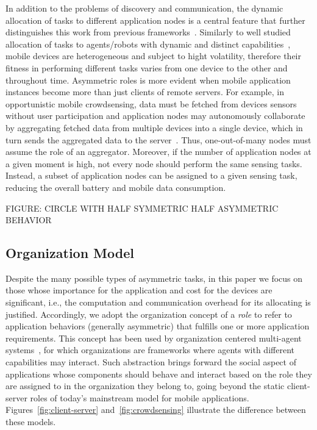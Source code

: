 In addition to the problems of discovery and communication, the dynamic allocation of tasks to different application nodes is a central feature that further distinguishes this work from previous frameworks~\cite{}. Similarly to well studied allocation of tasks to agents/robots with dynamic and distinct capabilities~\cite{}, mobile devices are heterogeneous and subject to hight volatility, therefore their fitness in performing different tasks varies from one device to the other and throughout time. Asymmetric roles is more evident when mobile application instances become more than just clients of remote servers. For example, in opportunistic mobile crowdsensing, data must be fetched from devices sensors without user participation and application nodes may autonomously collaborate by aggregating fetched data from multiple devices into a single device, which in turn sends the aggregated data to the server~\cite{}. Thus, one-out-of-many nodes must assume the role of an aggregator. Moreover, if the number of application nodes at a given moment is high, not every node should perform the same sensing tasks. Instead, a subset of application nodes can be assigned to a given sensing task, reducing the overall battery and mobile data consumption. 

FIGURE: CIRCLE WITH HALF SYMMETRIC HALF ASYMMETRIC BEHAVIOR

\subsection{Organization Model}

Despite the many possible types of asymmetric tasks, in this paper we focus on those whose importance for the application and cost for the devices are significant, i.e., the computation and communication overhead for its allocating is justified. Accordingly, we adopt the organization concept of a \textit{role} to refer to application behaviors (generally asymmetric) that fulfills one or more application requirements. This concept has been used by organization centered multi-agent systems~\cite{}, for which organizations are frameworks where agents with different capabilities may interact. Such abstraction brings forward the social aspect of applications whose components should behave and interact based on the role they are assigned to in the organization they belong to, going beyond the static client-server roles of today's mainstream model for mobile applications. Figures~\ref{fig:client-server} and~\ref{fig:crowdsensing} illustrate the difference between these models.

